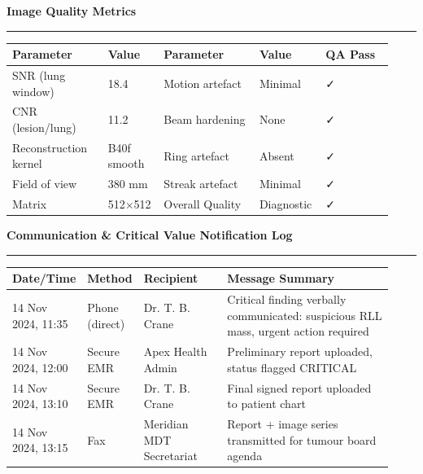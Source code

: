 \documentclass[11pt,a4paper]{article}
\newcommand{\subsectionrule}{%
  \vspace{1pt}%
  {\color{RadRule}\rule{\linewidth}{0.5pt}}%
  \vspace{3pt}%
}
\begin{document}
\begin{tcolorbox}[
  enhanced,
  colback=RadLight,
  colframe=RadTeal,
  arc=4pt, boxrule=1pt,
  left=8pt, right=8pt, top=7pt, bottom=7pt,
]
\noindent\textbf{\color{RadTeal}\faCheckCircle\hspace{4pt}Image Quality Metrics}
\vspace{5pt}

\subsectionrule{}

\small
\renewcommand{\arraystretch}{1.3}
\begin{tabular}{@{}p{0.24\linewidth}p{0.14\linewidth}p{0.24\linewidth}p{0.14\linewidth}p{0.17\linewidth}@{}}
  \toprule
  \textbf{Parameter} & \textbf{Value} & \textbf{Parameter} & \textbf{Value} & \textbf{QA Pass} \\
  \midrule{}
  SNR (lung window) & 18.4 & Motion artefact & Minimal & \textcolor{RadGreen}{\faCheck} \\
  \rowcolor{RadBg}
  CNR (lesion/lung) & 11.2 & Beam hardening & None & \textcolor{RadGreen}{\faCheck} \\
  Reconstruction kernel & B40f smooth & Ring artefact & Absent & \textcolor{RadGreen}{\faCheck} \\
  \rowcolor{RadBg}
  Field of view & 380 mm & Streak artefact & Minimal & \textcolor{RadGreen}{\faCheck} \\
  Matrix & 512$\times$512 & Overall Quality & Diagnostic & \textcolor{RadGreen}{\faCheck} \\
  \bottomrule
\end{tabular}
\end{tcolorbox}

\vspace{8pt}

\begin{tcolorbox}[slatebox]
\noindent\textbf{\color{RadBlue}\faPhone\hspace{4pt}Communication \& Critical Value Notification Log}
\vspace{5pt}

\subsectionrule{}

\small
\renewcommand{\arraystretch}{1.35}
\begin{tabular}{@{}p{0.14\linewidth}p{0.13\linewidth}p{0.22\linewidth}p{0.44\linewidth}@{}}
  \toprule
  \textbf{Date/Time} & \textbf{Method} & \textbf{Recipient} & \textbf{Message Summary} \\
  \midrule{}
  14 Nov 2024, 11:35 & Phone (direct) & Dr. T. B. Crane & Critical finding verbally communicated: suspicious RLL mass, urgent action required \\
  \rowcolor{RadBg}
  14 Nov 2024, 12:00 & Secure EMR & Apex Health Admin & Preliminary report uploaded, status flagged CRITICAL \\
  14 Nov 2024, 13:10 & Secure EMR & Dr. T. B. Crane & Final signed report uploaded to patient chart \\
  \rowcolor{RadBg}
  14 Nov 2024, 13:15 & Fax & Meridian MDT Secretariat & Report + image series transmitted for tumour board agenda \\
  \bottomrule
\end{tabular}
\end{tcolorbox}
\end{document}
